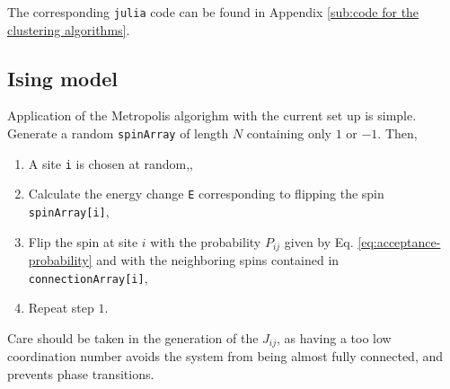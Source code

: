 The corresponding \texttt{julia} code can be found in Appendix \ref{sub:code for the clustering algorithms}.

% 
%
%

\subsection{Ising model}%
\label{sub:Ising model}

Application of the Metropolis algorighm with the current set up is simple. Generate a random \texttt{spinArray} of length $N$ containing only  $1$ or  $-1$. Then,
\begin{enumerate}
	\item A site \texttt{i} is chosen at random,,
	\item Calculate the energy change \texttt{E} corresponding to flipping the spin \texttt{spinArray[i]},
	\item Flip the spin at site $i$ with the probability $P_{ij}$ given by Eq. \eqref{eq:acceptance-probability} and with the neighboring spins contained in \texttt{connectionArray[i]},
	\item Repeat step $1$.
\end{enumerate}

Care should be taken in the generation of the $J_{ij}$, as having a too low coordination number avoids the system from being almost fully connected, and prevents phase transitions.
